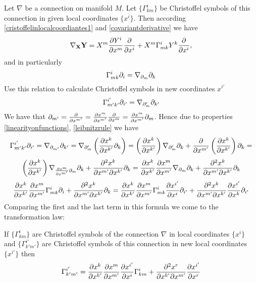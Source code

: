 \documentclass[12pt]{article}
\theoremstyle{theorem}
\numberwithin{equation}{section}
\begin{document}
 Let $\nabla$ be a connection on manifold $M$.
  Let $\{\Gamma^i_{km}\}$ be Christoffel symbols of this connection in  given local coordinates $\{x^i\}$.
  Then according \eqref{cristoffelinlocalcoordiantes1} and \eqref{covariantderivative} we have
                 $$
              \nabla_{\bf X}{\bf Y}=X^m{\partial Y^i\over \partial x^m}{\partial\over \partial x^i}+X^m\Gamma^i_{mk}Y^k{\partial\over \partial x^i},
                 $$
and in particularly
               $$
               \Gamma^i_{mk}\partial_i=\nabla_{\partial_m}\partial_k
               $$
  Use this relation to calculate Christoffel symbols in new coordinates $x^{i'}$
               $$
            \Gamma^{i'}_{m'k'}\partial_{i'}=
            \nabla_{\partial_m'}\partial_{k'}
               $$
  We have that $\partial_{m'}={\partial\over \partial x^{m'}}={\partial x^m\over \partial x^{m'}}{\partial\over \partial x^{m}}= {\partial x^m\over \partial x^{m'}}\partial_m $.
  Hence due to properties \eqref{linearityonfunctions}, \eqref{leibnitzrule} we have
    $$
          \Gamma^{i'}_{m'k'}\partial_{i'}=
            \nabla_{\partial_{m'}}\partial_{k'}=\nabla_{\partial_m'}\left({\partial x^k\over \partial x^{k'}}\partial_{k}\right)=
            \left({\partial x^k\over \partial x^{k'}}\right)\nabla_{\partial_m'}\partial_{k}+
            {\partial\over \partial x^{m'}}\left({\partial x^k\over \partial x^{k'}}\right)\partial_{k}=
    $$
              $$
    \left({\partial x^k\over \partial x^{k'}}\right)\nabla_{{\partial x^m\over \partial x^{m'}}\partial_m}\partial_{k}+
            {\partial^2  x^k\over \partial x^{m'}\partial x^{k'}}\partial_{k}=
                      {\partial x^k\over \partial x^{k'}}
          {\partial x^m\over \partial x^{m'}}
          \nabla_{\partial_m}\partial_{k}+
           {\partial^2  x^k\over \partial x^{m'}\partial x^{k'}}\partial_{k}
          $$
          $$
     {\partial x^k\over \partial x^{k'}}
          {\partial x^m\over \partial x^{m'}}
          \Gamma_{mk}^i\partial_i+{\partial^2  x^k\over \partial x^{m'}\partial x^{k'}}\partial_{k}=
          {\partial x^k\over \partial x^{k'}}
          {\partial x^m\over \partial x^{m'}}\Gamma_{mk}^i{\partial x^{i'}\over \partial x^i}\partial_{i'}+
          {\partial^2  x^k\over \partial x^{m'}\partial x^{k'}}{\partial x^{i'}\over \partial x^k}\partial_{i'}
          $$
Comparing the first and the last term in this formula we come to the transformation law:

\m

If $\{\Gamma^i_{km}\}$ are Christoffel symbols of the connection $\nabla$ in  local coordinates $\{x^i\}$
and $\{\Gamma^{i'}_{k'm'}\}$ are Christoffel symbols of this connection  in  new local coordinates $\{x^{i'}\}$
then
 \begin{equation}\label{formualfortransformationofconnection}
    \Gamma^{i'}_{k'm'}=
          {\partial x^k\over \partial x^{k'}}
          {\partial x^m\over \partial x^{m'}}
          {\partial x^{i'}\over \partial x^i}
          \Gamma_{km}^i+
    {\partial^2  x^r\over \partial x^{k'}\partial x^{m'}}{\partial x^{i'}\over \partial x^r}
 \end{equation}
\end{document}

